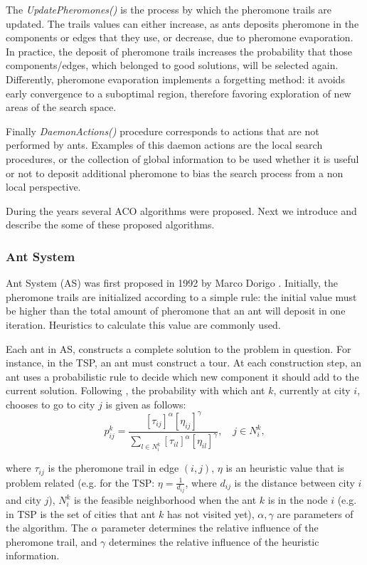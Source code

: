 				The \emph{UpdatePheromones()} is the process by which the pheromone trails are updated. The trails values can either increase, as ants deposits pheromone in the components or edges that they use, or decrease, due to pheromone evaporation. In practice, the deposit of pheromone trails increases the probability that those components/edges, which belonged to good solutions, will be selected again. Differently, pheromone evaporation implements a forgetting method: it avoids early convergence to a suboptimal region, therefore favoring exploration of new areas of the search space.
				 
				Finally \emph{DaemonActions()} procedure corresponds to actions that are not performed by ants. Examples of this daemon actions are the local search procedures, or the collection of global information to be used whether it is useful or not to deposit additional pheromone to bias the search process from a non local perspective.
				
				During the years several ACO algorithms were proposed. Next we introduce and describe the some of these proposed algorithms. 

					\subsubsection*{Ant System} 
					\label{sec:ant_system}
					Ant System (AS) was first proposed in 1992 by Marco Dorigo \cite{dorigo92, dorigo96}.
					Initially, the pheromone trails are initialized according to a simple rule: the initial value must be higher than the total amount of pheromone that an ant will deposit in one iteration. Heuristics to calculate this value are commonly used.

					Each ant in AS, constructs a complete solution to the problem in question. For instance, in the TSP, an ant must construct a tour. At each construction step, an ant uses a probabilistic rule to decide which new component it should add to the current solution. Following \cite{dorigo96}, the probability with which ant $k$, currently at city $i$, chooses to go to city $j$ is given as follows:
					\begin{equation}
						\label{eq:prob_rule_for_choice}
						p_{ij}^k = \frac{[\tau_{ij}]^\alpha[\eta_{ij}]^\gamma} {\sum_{l \in N_{i}^k} [\tau_{il}]^\alpha[\eta_{il}]^\gamma}, \quad j \in N_{i}^k,
					\end{equation}

		\noindent where $\tau_{ij}$ is the pheromone trail in edge $(i,j)$, $\eta$ is an heuristic value that is problem related (e.g. for the TSP: $\eta = \frac{1}{d_{ij}}$, where $d_{ij}$ is the distance between city $i$ and city $j$), $N_i^k$ is the feasible neighborhood when the ant $k$ is in the node $i$ (e.g. in TSP is the set of cities that ant $k$ has not visited yet), $\alpha, \gamma$ are parameters of the algorithm. The $\alpha$ parameter determines the relative influence of the pheromone trail, and $\gamma$ determines the relative influence of the heuristic information.

